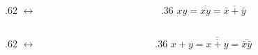 \begin{columns}[c,onlytextwidth]
\begin{column}{.62\textwidth}\centering
{}\quad$\leftrightarrow$\quad{}
\end{column}
\begin{column}{.36\textwidth}
\(xy=\overline{\overline{xy}}=\overline{\bar{x}+\bar{y}}\)
\end{column}\end{columns}
\vspace{2mm}
\begin{columns}[c,onlytextwidth]
\begin{column}{.62\textwidth}\centering
{}\quad$\leftrightarrow$\quad{}
\end{column}
\begin{column}{.36\textwidth}
\(x+y=\overline{\overline{x+y}}=\overline{\bar{x}\bar{y}}\)
\end{column}\end{columns}
